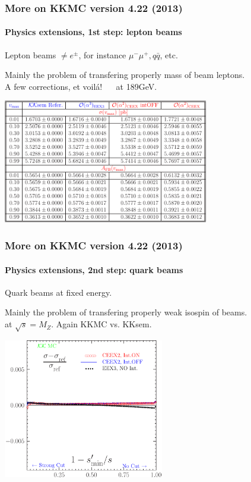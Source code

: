 \documentclass{beamer}
\newcommand{\cbl}{\color{blue}}
\begin{document}
\begin{frame}[fragile]
\frametitle{\bf More on KKMC version 4.22 (2013)}
\framesubtitle{\bf\large Physics extensions, 1st step: lepton beams}
\vspace{-2mm}
\large
Lepton {\cbl beams $\neq e^\pm$}, 
for instance $\mu^-\mu^+,q\bar{q}$, etc.

{\footnotesize
Mainly the problem of transfering properly mass of beam leptons.
}\\
A few corrections, et voil\'a!
~~\fbox{\cbl $\mu^- \mu^+ \to e^- e^+$} at 189GeV.

\includegraphics[width=90mm]{afb_int2-tab1-mu2e.pdf}

\end{frame}


\begin{frame}[fragile]
\frametitle{\bf More on KKMC version 4.22 (2013)}
\framesubtitle{\bf\large Physics extensions, 2nd step: quark beams}
\large
Quark {\cbl beams} at fixed energy.

{\footnotesize
Mainly the problem of transfering properly weak isospin of beams.
}\\
\fbox{\cbl $u \bar{u} \to e^- e^+ +n\gamma$}
at $\sqrt{s}=M_Z$. Again KKMC vs. KKsem.

\includegraphics[width=70mm]{afb_int2-Gsig-u2mu-91.pdf}

\end{frame}
\end{document}
